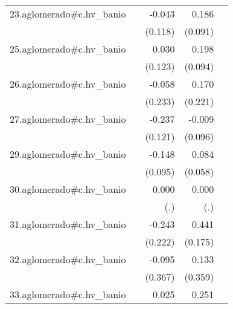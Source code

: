 {\begin{longtable}{l*{4}{D{.}{.}{-1}}}
\addlinespace
23.aglomerado#c.hv\_banio&                     &      -0.043         &       0.186\sym{*}  &                     \\
            &                     &     (0.118)         &     (0.091)         &                     \\
\addlinespace
25.aglomerado#c.hv\_banio&                     &       0.030         &       0.198\sym{*}  &                     \\
            &                     &     (0.123)         &     (0.094)         &                     \\
\addlinespace
26.aglomerado#c.hv\_banio&                     &      -0.058         &       0.170         &                     \\
            &                     &     (0.233)         &     (0.221)         &                     \\
\addlinespace
27.aglomerado#c.hv\_banio&                     &      -0.237         &      -0.009         &                     \\
            &                     &     (0.121)         &     (0.096)         &                     \\
\addlinespace
29.aglomerado#c.hv\_banio&                     &      -0.148         &       0.084         &                     \\
            &                     &     (0.095)         &     (0.058)         &                     \\
\addlinespace
30.aglomerado#c.hv\_banio&                     &       0.000         &       0.000         &                     \\
            &                     &         (.)         &         (.)         &                     \\
\addlinespace
31.aglomerado#c.hv\_banio&                     &      -0.243         &       0.441\sym{*}  &                     \\
            &                     &     (0.222)         &     (0.175)         &                     \\
\addlinespace
32.aglomerado#c.hv\_banio&                     &      -0.095         &       0.133         &                     \\
            &                     &     (0.367)         &     (0.359)         &                     \\
\addlinespace
33.aglomerado#c.hv\_banio&                     &       0.025         &       0.251\sym{***}&                     \\

\end{longtable}}
